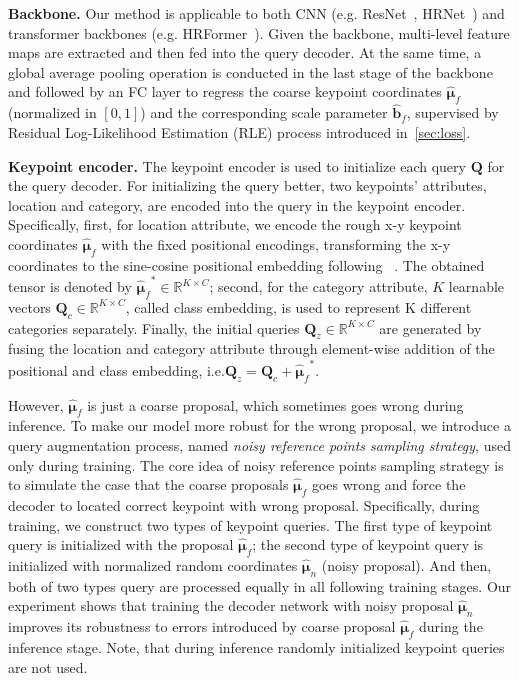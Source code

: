 \documentclass[runningheads]{llncs}
\def\ie{{i.e.\xspace}}
\def\R{{\mathbb R}}
\def\Loc{{\boldsymbol{\mu}}}
\def\loc{{\boldsymbol{\mu}}}
\def\b{{\boldsymbol{b}}}
\def\KPF{{\hat{\mathbf{\Loc}}_f}}
\def\kpn{{\hat{\mathbf{\loc}}_n}}
\def\KBF{{\hat{\mathbf{\b}}_f}}
\def\Q{{\mathbf{Q}}}
\def\QZ{{\Q_z}}
\def\Qc{{\Q_c}}
\begin{document}
\noindent\textbf{Backbone.} Our method is applicable to both CNN (e.g. ResNet~\cite{he2016deep}, HRNet~\cite{sun2019deep}) and transformer backbones (e.g. HRFormer~\cite{yuan2021hrformer}).  Given the backbone, multi-level feature maps are extracted and then fed into the query decoder. At the same time, a global average pooling operation is conducted in the last stage of the backbone and followed by an FC layer to regress the coarse keypoint coordinates $\KPF$ (normalized in $[0,1]$) and the corresponding scale parameter $\KBF$, supervised by Residual Log-Likelihood Estimation (RLE) process introduced in~\cref{sec:loss}.


\noindent\textbf{Keypoint encoder.} 
The keypoint encoder is used to initialize each query $\mathbf{Q}$ for the query decoder. For initializing the query better, two keypoints' attributes, location and category, are encoded into the query in the keypoint encoder.
Specifically, first, for location attribute, we encode the rough x-y keypoint coordinates $\KPF$ with the fixed positional encodings, transforming the x-y coordinates to the sine-cosine positional embedding following ~\cite{vaswani2017attention}. The obtained tensor is denoted by $\KPF^* \in \R^{K \times C}$; second, for the category attribute, $K$ learnable vectors $\Qc \in \R^{K \times C}$, called class embedding, is used to represent K different categories separately. Finally, the initial queries $\QZ \in \R^{K \times C}$ are generated by fusing the location and category attribute through element-wise addition of the positional and class embedding, \ie $\QZ = \Qc + \KPF^*$. 


However, $\KPF$ is just a coarse proposal, which sometimes goes wrong during inference. To make our model more robust for the wrong proposal, we introduce a query augmentation process, named \textit{noisy reference points sampling strategy}, used only during training. The core idea of noisy reference points sampling strategy is to simulate the case that the coarse proposals $\KPF$ goes wrong and force the decoder to located correct keypoint with wrong proposal. Specifically, during training, we construct two types of keypoint queries. The first type of keypoint query is initialized with the proposal $\KPF$; the second type of keypoint query is initialized with normalized random coordinates $\kpn$ (noisy proposal). And then, both of two types query are processed equally in all following training stages. Our experiment shows that training the decoder network with noisy proposal $\kpn$ improves its robustness to errors introduced by coarse proposal $\KPF$ during the inference stage. Note, that during inference randomly initialized keypoint queries are not used.
\end{document}
